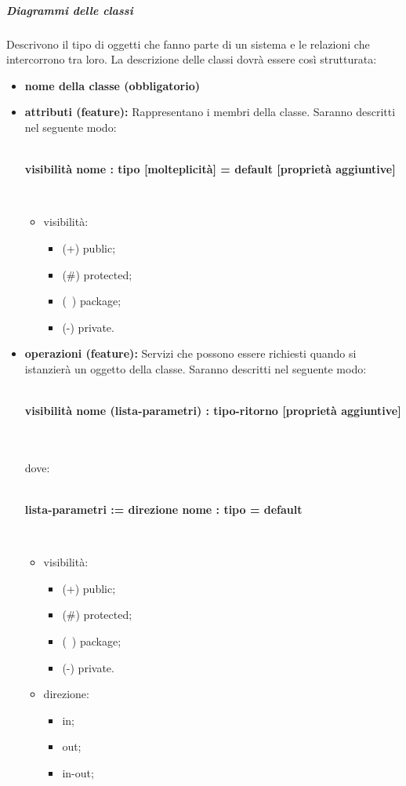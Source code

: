 \subparagraph*{Diagrammi delle classi} Descrivono il tipo di oggetti che fanno parte di un sistema e le relazioni che intercorrono tra loro. La descrizione delle classi dovrà essere così strutturata:
\begin{itemize}
	\item \textbf{nome della classe (obbligatorio)}
	\item \textbf{attributi (feature):} Rappresentano i membri della classe. Saranno descritti nel seguente modo: \\\\ \centerline{\textbf {visibilità nome : tipo [molteplicità] = default [proprietà aggiuntive]}}\\
	\begin{itemize}
		\item visibilità:
		\begin{itemize}
			\item (+) public;
			\item (\#) protected;
			\item (~) package;
			\item (-) private.
		\end{itemize}
	\end{itemize}
	\item \textbf{operazioni (feature):} Servizi che possono essere richiesti quando si istanzierà un oggetto della classe. Saranno descritti nel seguente modo: \\\\ \centerline{\textbf {visibilità nome (lista-parametri) : tipo-ritorno [proprietà aggiuntive]}}\\\\
	dove:
	\\\\ \centerline{\textbf {lista-parametri := direzione nome : tipo = default}}\\
	\begin{itemize}
		\item visibilità:
		\begin{itemize}
			\item (+) public;
			\item (\#) protected;
			\item (~) package;
			\item (-) private.
		\end{itemize}
		\item direzione:
		\begin{itemize}
			\item in;
			\item out;
			\item in-out;
		\end{itemize}
	\end{itemize}
\end{itemize}
